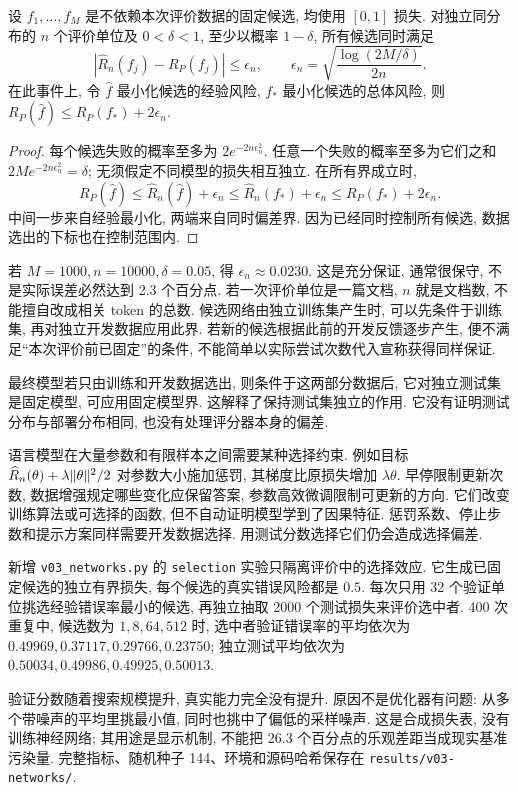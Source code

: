 \begin{proposition}[有限候选的同时保证]
设 $f_1,\ldots,f_M$ 是不依赖本次评价数据的固定候选, 均使用 $[0,1]$ 损失. 对独立同分布的 $n$ 个评价单位及 $0<\delta<1$, 至少以概率 $1-\delta$, 所有候选同时满足
\[
|\widehat R_n(f_j)-R_P(f_j)|\le
\epsilon_n,\qquad \epsilon_n=\sqrt{\frac{\log(2M/\delta)}{2n}}.
\]
在此事件上, 令 $\widehat f$ 最小化候选的经验风险, $f_*$ 最小化候选的总体风险, 则 $R_P(\widehat f)\le R_P(f_*)+2\epsilon_n$.
\end{proposition}
\begin{proof}
每个候选失败的概率至多为 $2e^{-2n\epsilon_n^2}$. 任意一个失败的概率至多为它们之和 $2Me^{-2n\epsilon_n^2}=\delta$; 无须假定不同模型的损失相互独立. 在所有界成立时,
\[
R_P(\widehat f)\le\widehat R_n(\widehat f)+\epsilon_n
\le\widehat R_n(f_*)+\epsilon_n\le R_P(f_*)+2\epsilon_n.
\]
中间一步来自经验最小化, 两端来自同时偏差界. 因为已经同时控制所有候选, 数据选出的下标也在控制范围内.
\end{proof}
若 $M=1000,n=10000,\delta=0.05$, 得 $\epsilon_n\approx0.0230$. 这是充分保证, 通常很保守, 不是实际误差必然达到 2.3 个百分点. 若一次评价单位是一篇文档, $n$ 就是文档数, 不能擅自改成相关 token 的总数. 候选网络由独立训练集产生时, 可以先条件于训练集, 再对独立开发数据应用此界. 若新的候选根据此前的开发反馈逐步产生, 便不满足“本次评价前已固定”的条件, 不能简单以实际尝试次数代入宣称获得同样保证.

最终模型若只由训练和开发数据选出, 则条件于这两部分数据后, 它对独立测试集是固定模型, 可应用固定模型界. 这解释了保持测试集独立的作用. 它没有证明测试分布与部署分布相同, 也没有处理评分器本身的偏差.

语言模型在大量参数和有限样本之间需要某种选择约束. 例如目标
$\widehat R_n(\theta)+\lambda\lVert \theta\rVert^2/2$ 对参数大小施加惩罚, 其梯度比原损失增加 $\lambda\theta$. 早停限制更新次数, 数据增强规定哪些变化应保留答案, 参数高效微调限制可更新的方向. 它们改变训练算法或可选择的函数, 但不自动证明模型学到了因果特征. 惩罚系数、停止步数和提示方案同样需要开发数据选择. 用测试分数选择它们仍会造成选择偏差.

新增 \texttt{v03\_networks.py} 的 \texttt{selection} 实验只隔离评价中的选择效应. 它生成已固定候选的独立有界损失, 每个候选的真实错误风险都是 $0.5$. 每次只用 32 个验证单位挑选经验错误率最小的候选, 再独立抽取 2000 个测试损失来评价选中者. 400 次重复中, 候选数为 $1,8,64,512$ 时, 选中者验证错误率的平均依次为 $0.49969,0.37117,0.29766,0.23750$; 独立测试平均依次为 $0.50034,0.49986,0.49925,0.50013$.

验证分数随着搜索规模提升, 真实能力完全没有提升. 原因不是优化器有问题: 从多个带噪声的平均里挑最小值, 同时也挑中了偏低的采样噪声. 这是合成损失表, 没有训练神经网络; 其用途是显示机制, 不能把 26.3 个百分点的乐观差距当成现实基准污染量. 完整指标、随机种子 144、环境和源码哈希保存在 \texttt{results/v03-networks/}.

